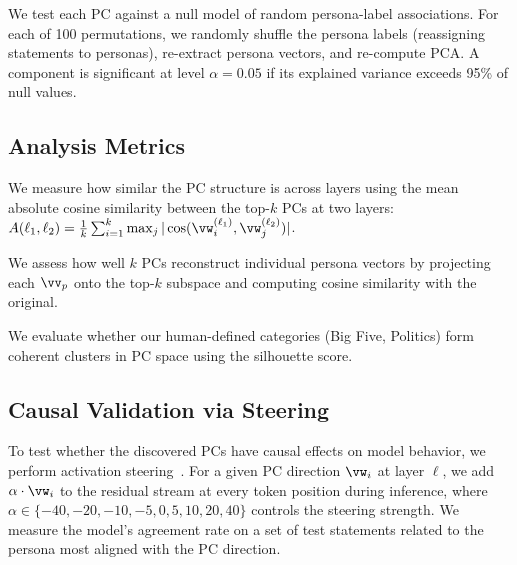  We test each PC against a null model of random persona-label associations. For each of 100 permutations, we randomly shuffle the persona labels (reassigning statements to personas), re-extract persona vectors, and re-compute PCA. A component is significant at level $\alpha = 0.05$ if its explained variance exceeds 95\% of null values.

\subsection{Analysis Metrics}
\label{sec:metrics}

 We measure how similar the PC structure is across layers using the mean absolute cosine similarity between the top-$k$ PCs at two layers:
$A(\ell_1, \ell_2) = \frac{1}{k} \sum_{i=1}^{k} \max_j |\cos(\vw_i^{(\ell_1)}, \vw_j^{(\ell_2)})|$.

 We assess how well $k$ PCs reconstruct individual persona vectors by projecting each $\vv_p$ onto the top-$k$ subspace and computing cosine similarity with the original.

 We evaluate whether our human-defined categories (\eg Big Five, Politics) form coherent clusters in PC space using the silhouette score.

\subsection{Causal Validation via Steering}
\label{sec:steering}

To test whether the discovered PCs have causal effects on model behavior, we perform activation steering~\citep{turner2023activation}. For a given PC direction $\vw_i$ at layer $\ell$, we add $\alpha \cdot \vw_i$ to the residual stream at every token position during inference, where $\alpha \in \{-40, -20, -10, -5, 0, 5, 10, 20, 40\}$ controls the steering strength. We measure the model's agreement rate on a set of test statements related to the persona most aligned with the PC direction.
